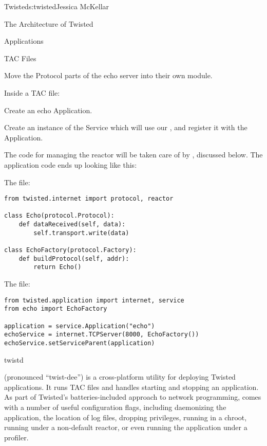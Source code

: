 \begin{aosachapter}{Twisted}{s:twisted}{Jessica McKellar}
\begin{aosasect1}{The Architecture of Twisted}
\begin{aosasect2}{Applications}
\begin{aosasect3}{TAC Files}
\begin{aosaenumerate}
  \item Move the Protocol parts of the echo server into their own
    module.
  \item Inside a TAC file:

  \begin{aosaenumerate2}
    \item Create an echo Application.
    \item Create an instance of the  Service which will use our
    , and register it with the Application.
  \end{aosaenumerate2}
\end{aosaenumerate}

The code for managing the reactor will be taken care of by
, discussed below. The application code ends up looking like
this:

The  file:

\begin{verbatim}
from twisted.internet import protocol, reactor

class Echo(protocol.Protocol):
    def dataReceived(self, data):
        self.transport.write(data)

class EchoFactory(protocol.Factory):
    def buildProtocol(self, addr):
        return Echo()
\end{verbatim}

\noindent The  file:

\begin{verbatim}
from twisted.application import internet, service
from echo import EchoFactory

application = service.Application("echo")
echoService = internet.TCPServer(8000, EchoFactory())
echoService.setServiceParent(application)
\end{verbatim}

\end{aosasect3}

\begin{aosasect3}{twistd}

 (pronounced ``twist-dee'') is a cross-platform utility for
deploying Twisted applications. It runs TAC files and handles starting and
stopping an application. As part of Twisted's batteries-included approach to
network programming,  comes with a number of useful configuration flags,
including daemonizing the application, the location of log files, dropping
privileges, running in a chroot, running under a non-default reactor, or even
running the application under a profiler.


\end{aosasect3}
\end{aosasect2}
\end{aosasect1}
\end{aosachapter}
